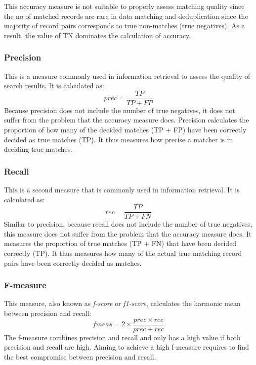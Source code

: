 This accuracy measure is not suitable to properly assess matching quality since the no of matched records are rare in data matching and deduplication since the majority of record pairs corresponds to true non-matches (true negatives). As a result, the value of TN dominates the calculation of accuracy.
\subsubsection{Precision}
This is a measure commonly used in information retrieval to assess the quality of search results. It is calculated as:
$$ prec=\frac{TP}{TP+FP}$$
Because precision does not include the number of true negatives, it does not suffer from the problem that the accuracy measure does. Precision calculates the proportion of how many of the decided matches (TP + FP) have been correctly decided as true matches (TP). It thus measures how precise a matcher is in deciding true matches.
\subsubsection{Recall}
This is a second measure that is commonly used in information retrieval. It is calculated as:
$$ rec=\frac{TP}{TP+FN}$$
Similar to precision, because recall does not include the number of true negatives, this measure does not suffer from the problem that the accuracy measure does. It measures the proportion of true matches (TP + FN) that have been decided correctly (TP). It thus measures how many of the actual true matching record pairs have been correctly decided as matches.
\subsubsection{F-measure}
This measure, also known as \textit{f-score} or \textit{f1-score}, calculates the harmonic mean between precision and recall:
$$ fmeas=2 \times \frac{prec\times rec}{prec+rec}$$
The f-measure combines precision and recall and only has a high value if both precision and recall are high. Aiming to achieve a high f-measure requires to find the best compromise between precision and recall.


